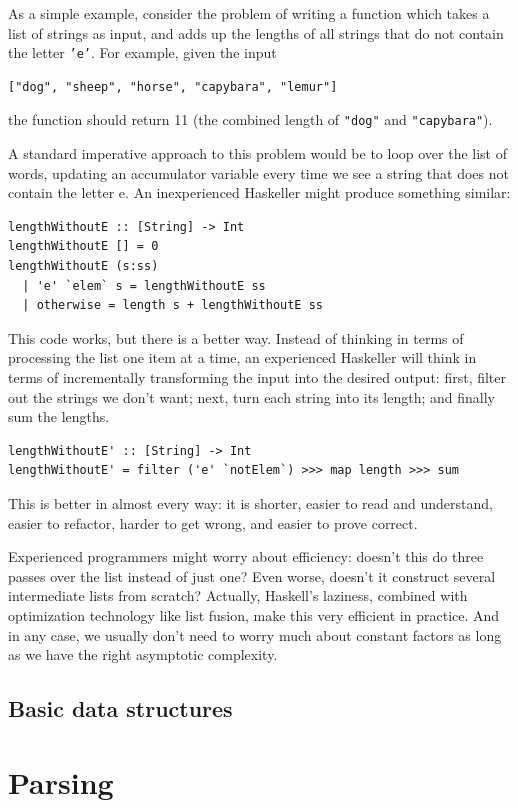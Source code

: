 \documentclass{book}
\newcommand{\h}[1]{\texttt{#1}}
\begin{document}
As a simple example, consider the problem of writing a function which
takes a list of strings as input, and adds up the lengths of all
strings that do not contain the letter \h{'e'}.  For example, given
the input
\begin{verbatim}
["dog", "sheep", "horse", "capybara", "lemur"]
\end{verbatim}
the function should return 11 (the combined length of \h{"dog"} and
\h{"capybara"}).

A standard imperative approach to this problem would be to loop over
the list of words, updating an accumulator variable every time we see
a string that does not contain the letter e.  An inexperienced
Haskeller might produce something similar:
\begin{verbatim}
lengthWithoutE :: [String] -> Int
lengthWithoutE [] = 0
lengthWithoutE (s:ss)
  | 'e' `elem` s = lengthWithoutE ss
  | otherwise = length s + lengthWithoutE ss
\end{verbatim}
This code works, but there is a better way.  Instead of thinking in
terms of processing the list one item at a time, an experienced
Haskeller will think in terms of incrementally transforming the input
into the desired output: first, filter out the strings we don't want;
next, turn each string into its length; and finally sum the lengths.
\begin{verbatim}
lengthWithoutE' :: [String] -> Int
lengthWithoutE' = filter ('e' `notElem`) >>> map length >>> sum
\end{verbatim}
This is better in almost every way: it is shorter, easier to read and
understand, easier to refactor, harder to get wrong, and easier to
prove correct.

Experienced programmers might worry about efficiency: doesn't this do
three passes over the list instead of just one?  Even worse, doesn't
it construct several intermediate lists from scratch?  Actually,
Haskell's laziness, combined with optimization technology like list
fusion, make this very efficient in practice.  And in any case, we
usually don't need to worry much about constant factors as long as we
have the right asymptotic complexity.

\section{Basic data structures}

\chapter{Parsing}
\label{chap:parsing}
\end{document}
